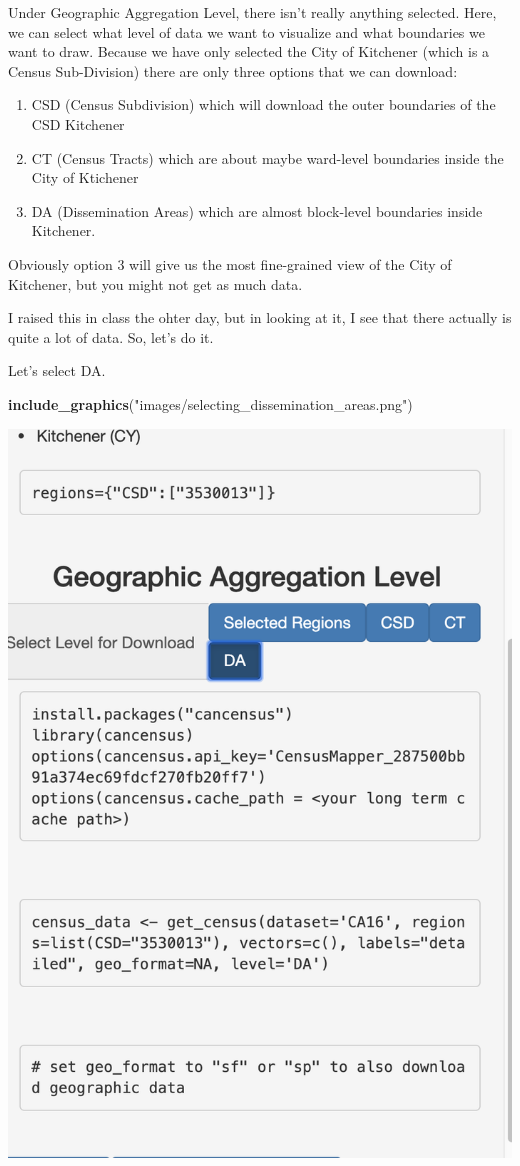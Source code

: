 \documentclass[
]{article}
\newenvironment{Shaded}{\begin{snugshade}}{\end{snugshade}}
\newcommand{\KeywordTok}[1]{\textcolor[rgb]{0.13,0.29,0.53}{\textbf{#1}}}
\newcommand{\NormalTok}[1]{#1}
\newcommand{\StringTok}[1]{\textcolor[rgb]{0.31,0.60,0.02}{#1}}
\providecommand{\tightlist}{%
  \setlength{\itemsep}{0pt}\setlength{\parskip}{0pt}}
\begin{document}
Under Geographic Aggregation Level, there isn't really anything
selected. Here, we can select what level of data we want to visualize
and what boundaries we want to draw. Because we have only selected the
City of Kitchener (which is a Census Sub-Division) there are only three
options that we can download:

\begin{enumerate}
\def\labelenumi{\arabic{enumi}.}
\tightlist
\item
  CSD (Census Subdivision) which will download the outer boundaries of
  the CSD Kitchener
\item
  CT (Census Tracts) which are about maybe ward-level boundaries inside
  the City of Ktichener
\item
  DA (Dissemination Areas) which are almost block-level boundaries
  inside Kitchener.
\end{enumerate}

Obviously option 3 will give us the most fine-grained view of the City
of Kitchener, but you might not get as much data.

I raised this in class the ohter day, but in looking at it, I see that
there actually is quite a lot of data. So, let's do it.

Let's select DA.

\begin{Shaded}
\begin{Highlighting}[]
\KeywordTok{include\_graphics}\NormalTok{(}\StringTok{"images/selecting\_dissemination\_areas.png"}\NormalTok{)}
\end{Highlighting}
\end{Shaded}

\begin{center}\includegraphics[width=0.5\linewidth]{images/selecting_dissemination_areas} \end{center}
\end{document}
